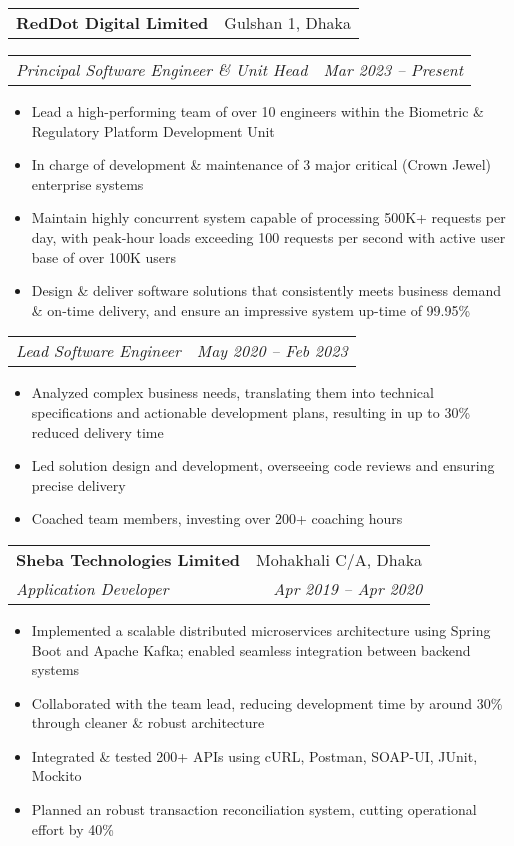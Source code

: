 \documentclass[letterpaper,11pt]{article}
\makeatletter
\newcommand{\resumeItem}[1]{
  \item\small{
    {#1 \vspace{-2pt}}
  }
}
\newcommand{\resumeSubheading}[4]{
  \vspace{-2pt}\item
    \begin{tabular*}{0.97\textwidth}[t]{l@{\extracolsep{\fill}}r}
      \textbf{#1} & #2 \\
      \textit{\small#3} & \textit{\small #4} \\
    \end{tabular*}\vspace{-7pt}
}
\newcommand{\resumeSubheadingCustom}[2]{
  \vspace{-2pt}\item
    \begin{tabular*}{0.97\textwidth}[t]{l@{\extracolsep{\fill}}r}
      \textbf{#1} & #2
    \end{tabular*}\vspace{-7pt}
}
\newcommand{\resumeSubSubheading}[2]{
    \item
    \begin{tabular*}{0.97\textwidth}{l@{\extracolsep{\fill}}r}
      \textit{\small#1} & \textit{\small #2} \\
    \end{tabular*}\vspace{-7pt}
}
\newcommand{\resumeSubHeadingListEnd}{\end{itemize}}
\newcommand{\resumeItemListStart}{\begin{itemize}}
\newcommand{\resumeItemListEnd}{\end{itemize}\vspace{-5pt}}
\makeatother
\begin{document}
    \resumeSubheadingCustom
        {RedDot Digital Limited}{Gulshan 1, Dhaka}{}{}
        \resumeSubSubheading
            {Principal Software Engineer \& Unit Head}{Mar 2023 -- Present}
        \resumeItemListStart
            \resumeItem{Lead a high-performing team of over 10 engineers within the Biometric \& Regulatory Platform Development Unit}
            \resumeItem{In charge of development \& maintenance of 3 major critical (Crown Jewel) enterprise systems}
            \resumeItem{Maintain highly concurrent system capable of processing 500K+ requests per day, with peak-hour loads exceeding 100 requests per second with active user base of over 100K users}
            \resumeItem{Design \& deliver software solutions that consistently meets business demand \& on-time delivery, and ensure an impressive system up-time of 99.95\%}
        \resumeItemListEnd
        \resumeSubSubheading
            {Lead Software Engineer}{May 2020 -- Feb 2023}
        \resumeItemListStart
            \resumeItem{Analyzed complex business needs, translating them into technical specifications and actionable development plans, resulting in up to 30\% reduced delivery time}
            \resumeItem{Led solution design and development, overseeing code reviews and ensuring precise delivery}
            \resumeItem{Coached team members, investing over 200+ coaching hours}
        \resumeItemListEnd
      

    \resumeSubheading
      {Sheba Technologies Limited}{Mohakhali C/A, Dhaka}
      {Application Developer}{Apr 2019 -- Apr 2020}
      \resumeItemListStart
        \resumeItem{Implemented a scalable distributed microservices architecture using Spring Boot and Apache Kafka; enabled seamless integration between backend systems}
        \resumeItem{Collaborated with the team lead, reducing development time by around 30\% through cleaner \& robust architecture}
        \resumeItem{Integrated \& tested 200+ APIs using cURL, Postman, SOAP-UI, JUnit, Mockito}
        \resumeItem{Planned an robust transaction reconciliation system, cutting operational effort by 40\%}
    \resumeItemListEnd
\end{document}
